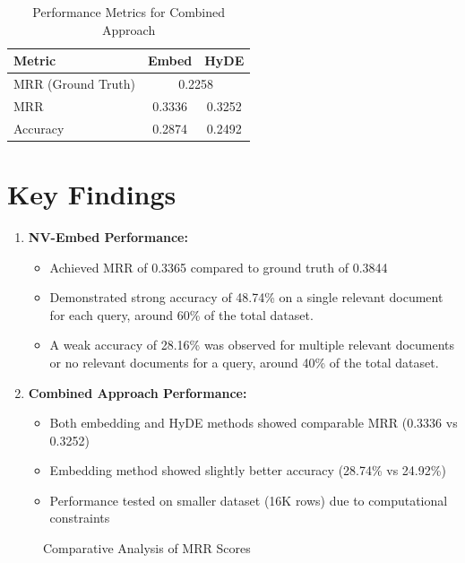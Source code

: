 \begin{table}[ht]
    \centering
    \caption{Performance Metrics for Combined Approach}
    \label{tab:combined_results}
    \begin{tabular}{|l|c|c|}
        \hline
        \textbf{Metric} & \textbf{Embed} & \textbf{HyDE} \\
        \hline
        MRR (Ground Truth) & \multicolumn{2}{c|}{0.2258} \\
        \hline
        MRR & 0.3336 & 0.3252 \\
        Accuracy & 0.2874 & 0.2492 \\
        \hline
    \end{tabular}
\end{table}

\section{Key Findings}
\begin{enumerate}
    \item \textbf{NV-Embed Performance:}
    \begin{itemize}
        \item Achieved MRR of 0.3365 compared to ground truth of 0.3844
        \item Demonstrated strong accuracy of 48.74\% on a single relevant document for each query, around 60\% of the total dataset.
        \item A weak accuracy of 28.16\% was observed for multiple relevant documents or no relevant documents for a query, around 40\% of the total dataset.
    \end{itemize}
    
    \item \textbf{Combined Approach Performance:}
    \begin{itemize}
        \item Both embedding and HyDE methods showed comparable MRR (0.3336 vs 0.3252)
        \item Embedding method showed slightly better accuracy (28.74\% vs 24.92\%)
        \item Performance tested on smaller dataset (16K rows) due to computational constraints
    \end{itemize}
\end{enumerate}

\begin{figure}[ht]
    \centering
    \caption{Comparative Analysis of MRR Scores}
    \label{fig:mrr_comparison}
\end{figure}
